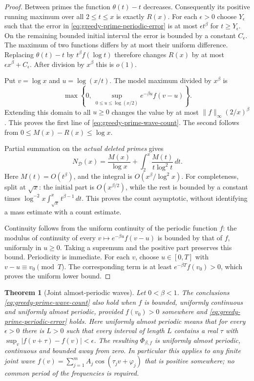 \documentclass[11pt]{article}
\newtheorem{theorem}{Theorem}[section]
\theoremstyle{definition}
\begin{document}
\begin{proof}
Between primes the function $\theta(t)-t$ decreases. Consequently
its positive running maximum over all $2\le t\le x$ is exactly $R(x)$.
For each $\epsilon>0$ choose $Y_\epsilon$ such that the error in
\eqref{eq:greedy-prime-periodic-error} is at most
$\epsilon t^\beta$ for $t\ge Y_\epsilon$.
On the remaining bounded initial interval the error is bounded by
a constant $C_\epsilon$.
The maximum of two functions differs by at most their uniform difference.
Replacing $\theta(t)-t$ by $t^\beta f(\log t)$ therefore changes
$R(x)$ by at most $\epsilon x^\beta+C_\epsilon$.
After division by $x^\beta$ this is $o(1)$.

Put $v=\log x$ and $u=\log(x/t)$.
The model maximum divided by $x^\beta$ is
\[
 \max\left\{0,\ \sup_{0\le u\le\log(x/2)}
                           e^{-\beta u}f(v-u)\right\}.
\]
Extending this domain to all $u\ge0$ changes the value by at most
$\|f\|_\infty(2/x)^\beta$.
This proves the first line of \eqref{eq:greedy-prime-wave-count}.
The second follows from $0\le M(x)-R(x)\le\log x$.

Partial summation on the \emph{actual deleted primes} gives
\[
 N_{\mathcal D}(x)=\frac{M(x)}{\log x}
                  +\int_2^x\frac{M(t)}{t\log^2t}\,dt.
\]
Here $M(t)=O(t^\beta)$, and the integral is
$O(x^\beta/\log^2x)$.
For completeness, split at $\sqrt x$:
the initial part is $O(x^{\beta/2})$, while the rest is bounded
by a constant times
$\log^{-2}x\int_{\sqrt x}^x t^{\beta-1}\,dt$.
This proves the count asymptotic, without identifying a mass estimate
with a count estimate.

Continuity follows from the uniform continuity of the periodic function
$f$: the modulus of continuity of every
$v\mapsto e^{-\beta u}f(v-u)$ is bounded by that of $f$,
uniformly in $u\ge0$. Taking a supremum and the positive part preserves
this bound. Periodicity is immediate.
For each $v$, choose $u\in[0,T]$ with
$v-u\equiv v_0\pmod T$.
The corresponding term is at least $e^{-\beta T}f(v_0)>0$,
which proves the uniform lower bound.
\end{proof}

\begin{theorem}[Joint almost-periodic waves]
\label{thm:greedy-prime-joint-wave-envelope}
Let $0<\beta<1$.
The conclusions \eqref{eq:greedy-prime-wave-count} also hold when $f$
is bounded, uniformly continuous and uniformly almost periodic,
provided $f(v_0)>0$ somewhere and
\eqref{eq:greedy-prime-periodic-error} holds.
Here uniformly almost periodic means that for every $\epsilon>0$
there is $L>0$ such that every interval of length $L$ contains
a real $\tau$ with
$\sup_v|f(v+\tau)-f(v)|<\epsilon$.
The resulting $\Phi_{\beta,f}$ is uniformly almost periodic,
continuous and bounded away from zero.
In particular this applies to any finite joint wave
$f(v)=\sum_{j=1}^m A_j\cos(\tau_jv+\varphi_j)$ that is positive
somewhere; no common period of the frequencies is required.
\end{theorem}
\end{document}
